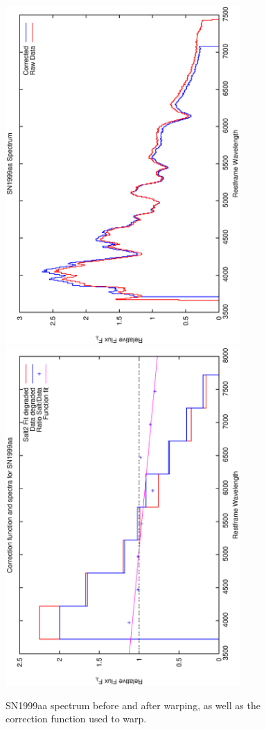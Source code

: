 \clearpage

\begin{figure}[p]
\centering
\includegraphics[angle=-90,width=0.8\textwidth]{./figures/spectrabeforeafter/SN1999aa_handpicked_v001_v023_before_after_spectra.ps}
\hfill
\includegraphics[angle=-90,width=0.8\textwidth]{./figures/corrections/SN1999aa_v001_correction.ps}
\hfill
\caption{SN1999aa spectrum before and after warping, as well as the correction function used to warp.}
\label{fig:SN1999aafour1}
\end{figure}

